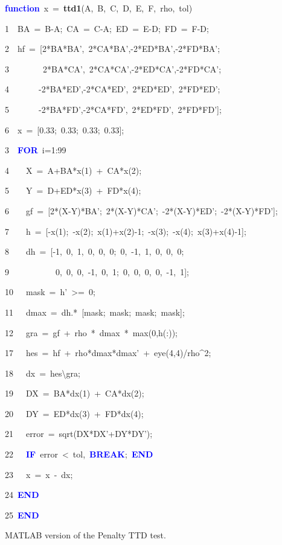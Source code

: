 \documentclass[times,12pt]{ACME2015article}
\newenvironment{lyxcode}
{\par\begin{list}{}{
\setlength{\rightmargin}{\leftmargin}
\setlength{\listparindent}{0pt}%
\raggedright
\setlength{\itemsep}{0pt}
\setlength{\parsep}{0pt}
\normalfont\ttfamily}%
 \item[]}
{\end{list}}
\begin{document}
\begin{algorithm}
\begin{lyxcode}
\textbf{\textcolor{blue}{function}}~x~=~\textbf{ttd1}(A,~B,~C,~D,~E,~F,~rho,~tol)

1~~BA~=~B-A;~CA~=~C-A;~ED~=~E-D;~FD~=~F-D;

2~~hf~=~{[}2{*}BA{*}BA',~2{*}CA{*}BA',-2{*}ED{*}BA',-2{*}FD{*}BA';

3~~~~~~~~2{*}BA{*}CA',~2{*}CA{*}CA',-2{*}ED{*}CA',-2{*}FD{*}CA';

4~~~~~~~-2{*}BA{*}ED',-2{*}CA{*}ED',~2{*}ED{*}ED',~2{*}FD{*}ED';

5~~~~~~~-2{*}BA{*}FD',-2{*}CA{*}FD',~2{*}ED{*}FD',~2{*}FD{*}FD'{]};

6~~x~=~{[}0.33;~0.33;~0.33;~0.33{]};

3~~\textbf{\textcolor{blue}{FOR}}~i=1:99

4~~~~X~=~A+BA{*}x(1)~+~CA{*}x(2);

5~~~~Y~=~D+ED{*}x(3)~+~FD{*}x(4);

6~~~~gf~=~{[}2{*}(X-Y){*}BA';~2{*}(X-Y){*}CA';~-2{*}(X-Y){*}ED';~-2{*}(X-Y){*}FD'{]};~

7~~~~h~=~{[}-x(1);~-x(2);~x(1)+x(2)-1;~-x(3);~-x(4);~x(3)+x(4)-1{]};

8~~~~dh~=~{[}-1,~0,~1,~0,~0,~0;~0,~-1,~1,~0,~0,~0;

9~~~~~~~~~~~0,~0,~0,~-1,~0,~1;~0,~0,~0,~0,~-1,~1{]};

10~~~mask~=~h'~>=~0;

11~~~dmax~=~dh.{*}~{[}mask;~mask;~mask;~mask{]};

12~~~gra~=~gf~+~rho~{*}~dmax~{*}~max(0,h(:));

17~~~hes~=~hf~+~rho{*}dmax{*}dmax'~+~eye(4,4)/rho\textasciicircum{}2;

18~~~dx~=~hes\textbackslash{}gra;

19~~~DX~=~BA{*}dx(1)~+~CA{*}dx(2);

20~~~DY~=~ED{*}dx(3)~+~FD{*}dx(4);

21~~~error~=~sqrt(DX{*}DX'+DY{*}DY');

22~~~\textbf{\textcolor{blue}{IF}}~error~<~tol,~\textbf{\textcolor{blue}{BREAK}};~\textbf{\textcolor{blue}{END}}

23~~~x~=~x~-~dx;

24~\textbf{\textcolor{blue}{END}}

25~\textbf{\textcolor{blue}{END}}
\end{lyxcode}
\protect\caption{\label{alg10}MATLAB version of the Penalty TTD test.}
\end{algorithm}
\end{document}
